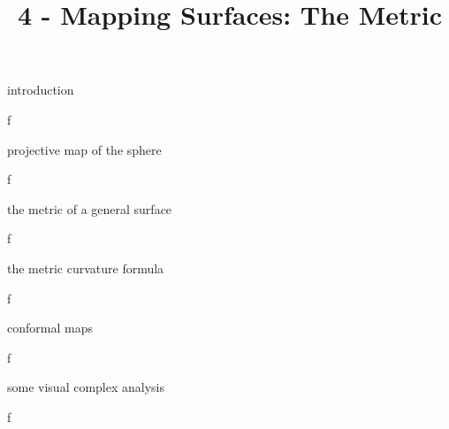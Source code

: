 \documentclass{article}
\title{4 - Mapping Surfaces: The Metric}
\newenvironment{andrew_section}[1]
    {
    \section{#1}
    \begin{itemize}
    }
    {
    \end{itemize}
    }
\begin{document}
\maketitle

\begin{andrew_section}{introduction}
    \item f
\end{andrew_section}

\begin{andrew_section}{projective map of the sphere}
    \item f
\end{andrew_section}

\begin{andrew_section}{the metric of a general surface}
    \item f
\end{andrew_section}

\begin{andrew_section}{the metric curvature formula}
    \item f
\end{andrew_section}

\begin{andrew_section}{conformal maps}
    \item f
\end{andrew_section}

\begin{andrew_section}{some visual complex analysis}
    \item f
\end{andrew_section}
\end{document}
